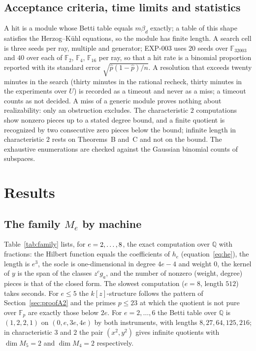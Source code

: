 \documentclass[11pt]{article}
\theoremstyle{definition}
\theoremstyle{remark}
\newcommand{\EXP}[1]{\mbox{EXP-#1}}
\newcommand{\Q}{\mathbb{Q}}
\newcommand{\F}{\mathbb{F}}
\begin{document}
\subsection{Acceptance criteria, time limits and statistics}

A hit is a module whose Betti table equals $m\beta_d$ exactly; a table of this shape satisfies the Herzog--K\"uhl equations, so the module has finite length. A search cell is three seeds per ray, multiple and generator; \EXP{003} uses $20$ seeds over $\F_{32003}$ and $40$ over each of $\F_2$, $\F_4$, $\F_{16}$ per ray, so that a hit rate is a binomial proportion reported with its standard error $\sqrt{\hat p(1-\hat p)/n}$. A resolution that exceeds twenty minutes in the search (thirty minutes in the rational recheck, thirty minutes in the experiments over $U$) is recorded as a timeout and never as a miss; a timeout counts as not decided. A miss of a generic module proves nothing about realizability: only an obstruction excludes. The characteristic $2$ computations show nonzero pieces up to a stated degree bound, and a finite quotient is recognized by two consecutive zero pieces below the bound; infinite length in characteristic $2$ rests on Theorems~B and~C and not on the bound. The exhaustive enumerations are checked against the Gaussian binomial counts of subspaces.

\FloatBarrier
\section{Results}
\label{sec:results}

\subsection{The family \texorpdfstring{$M_e$}{Me} by machine}

Table~\ref{tab:family} lists, for $e=2,\dots,8$, the exact computation over $\Q$ with fractions: the Hilbert function equals the coefficients of $h_e$ (equation~\eqref{eq:he}), the length is $e^3$, the socle is one-dimensional in degree $4e-4$ and weight $0$, the kernel of $y$ is the span of the classes $z^cg_a$, and the number of nonzero (weight, degree) pieces is that of the closed form. The slowest computation ($e=8$, length $512$) takes \nfamilySecondsMax{} seconds. For $e\le5$ the $k[z]$-structure follows the pattern of Section~\ref{sec:proofA2} and the primes $p\le23$ at which the quotient is not pure over $\F_p$ are exactly those below $2e$. For $e=2,\dots,6$ the Betti table over $\Q$ is $(1,2,2,1)$ on $(0,e,3e,4e)$ by both instruments, with lengths $8,27,64,125,216$; in characteristic $3$ and $2$ the pair $(x^2,y^2)$ gives infinite quotients with $\dim M_5=2$ and $\dim M_4=2$ respectively.
\end{document}
